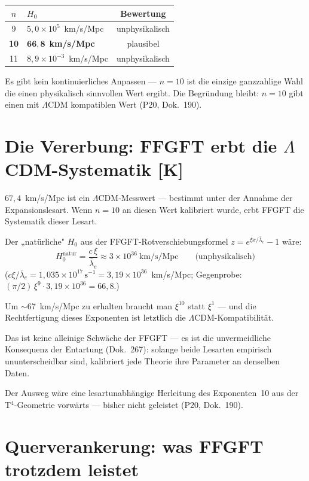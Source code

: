 \begin{center}
\begin{tabular}{clc}
\toprule
$n$ & $H_0$ & Bewertung \\
\midrule
9  & $5{,}0\times10^5$~km/s/Mpc & unphysikalisch \\
\textbf{10} & $\mathbf{66{,}8}$~\textbf{km/s/Mpc} & plausibel \\
11 & $8{,}9\times10^{-3}$~km/s/Mpc & unphysikalisch \\
\bottomrule
\end{tabular}
\end{center}

Es gibt kein kontinuierliches Anpassen — $n=10$ ist die einzige
ganzzahlige Wahl die einen physikalisch sinnvollen Wert ergibt.
Die Begründung bleibt: $n=10$ gibt einen mit $\Lambda$CDM
kompatiblen Wert (P20, Dok.~190).

\section{Die Vererbung: FFGFT erbt die $\Lambda$CDM-Systematik [K]}

$67{,}4$~km/s/Mpc ist ein $\Lambda$CDM-Messwert — bestimmt unter
der Annahme der Expansionslesart. Wenn $n=10$ an diesen Wert
kalibriert wurde, erbt FFGFT die Systematik dieser Lesart.

Der „natürliche" $H_0$ aus der FFGFT-Rotverschiebungsformel
$z = e^{\xi x/\bar\lambda_e} - 1$ wäre:
\[
  H_0^\text{natur} = \frac{c\,\xi}{\bar\lambda_e}
  \approx 3\times10^{36}~\text{km/s/Mpc}
  \qquad\text{(unphysikalisch)}
\]
($c\xi/\bar\lambda_e = 1{,}035\times10^{17}\,\mathrm{s}^{-1} = 3{,}19\times10^{36}$~km/s/Mpc; Gegenprobe: $(\pi/2)\,\xi^9\cdot3{,}19\times10^{36} = 66{,}8$.)

Um $\sim$67~km/s/Mpc zu erhalten braucht man $\xi^{10}$ statt $\xi^1$ —
und die Rechtfertigung dieses Exponenten ist letztlich die
$\Lambda$CDM-Kompatibilität.

Das ist keine alleinige Schwäche der FFGFT — es ist die unvermeidliche
Konsequenz der Entartung (Dok.~267): solange beide Lesarten empirisch
ununterscheidbar sind, kalibriert jede Theorie ihre Parameter an
denselben Daten.

Der Ausweg wäre eine lesartunabhängige Herleitung des Exponenten~10
aus der T$^4$-Geometrie vorwärts — bisher nicht geleistet (P20, Dok.~190).

\section{Querverankerung: was FFGFT trotzdem leistet}


